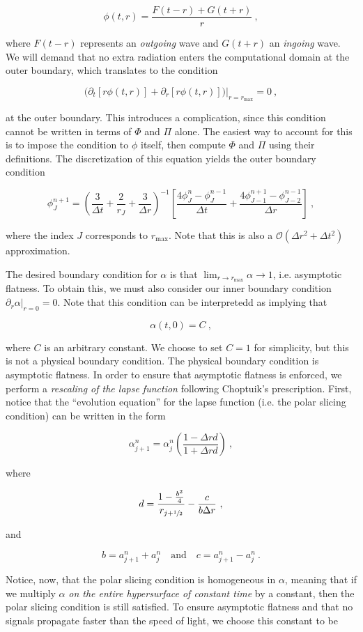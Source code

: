 \documentclass[a4paper,11pt]{article}
\renewcommand{\a}{\alpha}
\newcommand{\pd}{\partial}
\newcommand{\dt}{\Delta t}
\newcommand{\dr}{\Delta r}
\newcommand{\order}[2]{\mathcal{O}\lrpar{#1^{#2}}}
\newcommand{\lrpar}[1]{\left( #1 \right)}
\newcommand{\lrsquare}[1]{\left[ #1 \right]}
\newcommand{\blrpar}[1]{\big( #1 \big)}
\newcommand{\n}{\noindent}
\newcommand{\eq}[1]{
  \begin{equation}
    #1
  \end{equation}
}
\begin{document}
\eq{ \phi(t,r) = \frac{F(t-r) + G(t+r)}{r}\ , }

\n where $F(t-r)$ represents an \emph{outgoing} wave and $G(t+r)$ an \emph{ingoing} wave. We will demand that no extra radiation enters the computational domain at the outer boundary, which translates to the condition

\eq{ \left.\blrpar{\pd_{t}\lrsquare{r\phi(t,r)} + \pd_{r}\lrsquare{r\phi(t,r)}}\right|_{r=r_{\max}} = 0\ , }

\n at the outer boundary. This introduces a complication, since this condition cannot be written in terms of $\Phi$ and $\Pi$ alone. The easiest way to account for this is to impose the condition to $\phi$ itself, then compute $\Phi$ and $\Pi$ using their definitions. The discretization of this equation yields the outer boundary condition

\eq{ \phi^{n+1}_{J} = \lrpar{\frac{3}{\dt} + \frac{2}{r_{J}} + \frac{3}{\dr}}^{-1}\lrsquare{\frac{4\phi^{n}_{J} - \phi^{n-1}_{J}}{\dt} + \frac{4\phi^{n+1}_{J-1} - \phi^{n-1}_{J-2}}{\dr}}\ ,}

\n where the index $J$ corresponds to $r_{\max}$. Note that this is also a $\order{\dr^{2}+\dt}{2}$ approximation.

The desired boundary condition for $\a$ is that $\lim_{r\to r_{\max}}\a\to 1$, i.e. asymptotic flatness. To obtain this, we must also consider our inner boundary condition $\left.\pd_{r}\a\right|_{r=0}=0$. Note that this condition can be interpretedd as implying that

\eq{ \alpha(t,0) = C\ , }

\n where $C$ is an arbitrary constant. We choose to set $C=1$ for simplicity, but this is not a physical boundary condition. The physical boundary condition is asymptotic flatness. In order to ensure that asymptotic flatness is enforced, we perform a \emph{rescaling of the lapse function} following Choptuik's prescription. First, notice that the ``evolution equation'' for the lapse function (i.e. the polar slicing condition) can be written in the form

\eq{ \a^{n}_{j+1} = \a^{n}_{j}\lrpar{\frac{1-\dr d}{1+\dr d}} \ ,}

\n where

\eq{ d = \frac{1 - \frac{b^{2}}{4}}{r_{j+\sfrac{1}{2}}} - \frac{c}{b\dr}\ ,}

\n and

\eq{ b = a^{n}_{j+1} + a^{n}_{j}\quad \text{and}\quad c = a^{n}_{j+1} - a^{n}_{j}\ .}

Notice, now, that the polar slicing condition is homogeneous in $\a$, meaning that if we multiply $\a$ \emph{on the entire hypersurface of constant time} by a constant, then the polar slicing condition is still satisfied. To ensure asymptotic flatness and that no signals propagate faster than the speed of light, we choose this constant to be
\end{document}
